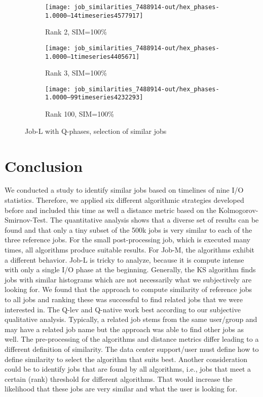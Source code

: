 \documentclass{jhps}
\begin{document}
\begin{figure}[bt]
\begin{subfigure}{0.47\textwidth}
\centering
\texttt{[image: job\_similarities\_7488914-out/hex\_phases-1.0000--14timeseries4577917]}
\caption{Rank 2, SIM=100\%}
\end{subfigure}
\begin{subfigure}{0.47\textwidth}
\centering
\texttt{[image: job\_similarities\_7488914-out/hex\_phases-1.0000--1timeseries4405671]}
\caption{Rank 3, SIM=100\%}
\end{subfigure}
\begin{subfigure}{0.47\textwidth}
\centering
\texttt{[image: job\_similarities\_7488914-out/hex\_phases-1.0000--99timeseries4232293]}
\caption{Rank 100, SIM=100\%}
\end{subfigure}

\caption{Job-L with Q-phases, selection of similar jobs}%
\label{fig:job-L-hex-phases}
\end{figure}




\section{Conclusion}%
\label{sec:summary}

We conducted a study to identify similar jobs based on timelines of nine I/O statistics.
Therefore, we applied six different algorithmic strategies developed before and included this time as well a distance metric based on the Kolmogorov-Smirnov-Test.
The quantitative analysis shows that a diverse set of results can be found and that only a tiny subset of the 500k jobs is very similar to each of the three reference jobs.
For the small post-processing job, which is executed many times, all algorithms produce suitable results.
For Job-M, the algorithms exhibit a different behavior.
Job-L is tricky to analyze, because it is compute intense with only a single I/O phase at the beginning.
Generally, the KS algorithm finds jobs with similar histograms which are not necessarily what we subjectively are looking for.
We found that the approach to compute similarity of reference jobs to all jobs and ranking these was successful to find related jobs that we were interested in.
The Q-lev and Q-native work best according to our subjective qualitative analysis.
Typically, a related job stems from the same user/group and may have a related job name but the approach was able to find other jobs as well.
The pre-processing of the algorithms and distance metrics differ leading to a different definition of similarity.
The data center support/user must define how to define similarity to select the algorithm that suits best.
Another consideration could be to identify jobs that are found by all algorithms, i.e., jobs that meet a certain (rank) threshold for different algorithms.
That would increase the likelihood that these jobs are very similar and what the user is looking for.
\end{document}
